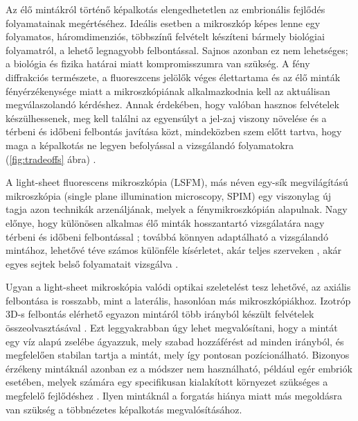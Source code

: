 \documentclass{booklet_style}
\begin{document}
Az élő mintákról történő képalkotás elengedhetetlen az embrionális fejlődés folyamatainak megértéséhez. Ideális esetben a mikroszkóp képes lenne egy folyamatos, háromdimenziós, többszínű felvételt készíteni bármely biológiai folyamatról, a lehető legnagyobb felbontással. Sajnos azonban ez nem lehetséges; a biológia és fizika határai miatt kompromisszumra van szükség. A fény diffrakciós természete, a fluoreszcens jelölők véges élettartama és az élő minták fényérzékenysége miatt a mikroszkópiának alkalmazkodnia kell az aktuálisan megválaszolandó kérdéshez. Annak érdekében, hogy valóban hasznos felvételek készülhessenek, meg kell találni az egyensúlyt a jel-zaj viszony növelése és a térbeni és időbeni felbontás javítása közt, mindeközben szem előtt tartva, hogy maga a képalkotás ne legyen befolyással a vizsgálandó folyamatokra (\ref{fig:tradeoffs} ábra) \cite{laissue_assessing_2017}.

A light-sheet fluorescens mikroszkópia (LSFM), más néven egy-sík megvilágítású mikroszkópia (single plane illumination microscopy, SPIM) \cite{huisken_optical_2004} egy viszonylag új tagja azon technikák arzenáljának, melyek a fénymikroszkópián alapulnak. Nagy előnye, hogy különösen alkalmas élő minták hosszantartó vizsgálatára nagy térbeni és időbeni felbontással \cite{keller_quantitative_2008, huisken_selective_2009, weber_light_2011,tomer_shedding_2011}; továbbá könnyen adaptálható a vizsgálandó mintához, lehetővé téve számos különféle kísérletet, akár teljes szerveken \cite{dodt_ultramicroscopy:_2007}, akár egyes sejtek belső folyamatait vizsgálva \cite{chen_lattice_2014}.

Ugyan a light-sheet mikroskópia valódi optikai szeletelést tesz lehetővé, az axiális felbontása is rosszabb, mint a laterális, hasonlóan más mikroszkópiákhoz.
Izotróp 3D-s felbontás elérhető egyazon mintáról több irányból készült felvételek összeolvasztásával \cite{preibisch_efficient_2014}. Ezt leggyakrabban úgy lehet megvalósítani, hogy a mintát egy víz alapú zselébe ágyazzuk, mely szabad hozzáférést ad minden irányból, és megfelelően stabilan tartja a mintát, mely így pontosan pozícionálható. Bizonyos érzékeny mintáknál azonban ez a módszer nem használható, például egér embriók esetében, melyek számára egy specifikusan kialakított környezet szükséges a megfelelő fejlődéshez \cite{doherty_culture_2000}. Ilyen mintáknál a forgatás hiánya miatt más megoldásra van szükség a többnézetes képalkotás megvalósításához.
\end{document}
